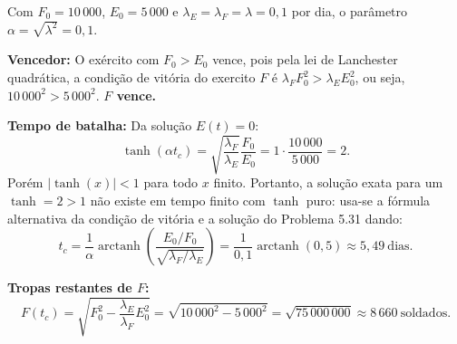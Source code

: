 Com $F_0=10\,000$, $E_0=5\,000$ e $\lambda_E=\lambda_F=\lambda=0{,}1$ por dia, o parâmetro $\alpha = \sqrt{\lambda^2} = 0{,}1$.

\textbf{Vencedor:} O exército com $F_0 > E_0$ vence, pois pela lei de Lanchester quadrática, a condição de vitória do exercito $F$ é $\lambda_F F_0^2 > \lambda_E E_0^2$, ou seja, $10\,000^2 > 5\,000^2$. \textbf{$F$ vence.}

\textbf{Tempo de batalha:}
Da solução $E(t)=0$:
\[
\tanh(\alpha t_c) = \sqrt{\frac{\lambda_F}{\lambda_E}}\frac{F_0}{E_0} = 1\cdot\frac{10\,000}{5\,000} = 2.
\]
Porém $|\tanh(x)|<1$ para todo $x$ finito. Portanto, a solução exata para um
$\tanh = 2 > 1$ não existe em tempo finito com $\tanh$ puro: usa-se a fórmula alternativa da condição de vitória e a solução do Problema 5.31 dando:
\[
t_c = \frac{1}{\alpha}\operatorname{arctanh}\!\left(\frac{E_0/F_0}{\sqrt{\lambda_F/\lambda_E}}\right)=\frac{1}{0{,}1}\operatorname{arctanh}(0{,}5)\approx 5{,}49\ \mathrm{dias}.
\]

\textbf{Tropas restantes de $F$:}
\[
F(t_c) = \sqrt{F_0^2 - \frac{\lambda_E}{\lambda_F}E_0^2} = \sqrt{10\,000^2 - 5\,000^2} = \sqrt{75\,000\,000} \approx 8\,660\ \text{soldados}.
\]